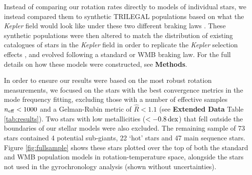 \documentclass[12pt]{article}
\newcommand{\kepler}{\emph{Kepler}\xspace}
\begin{document}
Instead of comparing our rotation rates directly to models of individual stars, we instead compared them to synthetic TRILEGAL populations based on what the \textit{Kepler} field would look like under these two different braking laws \cite{vansaders+2019, girardi+2012}. These synthetic populations were then altered to match the distribution of existing catalogues of stars in the \kepler field in order to replicate the \kepler selection effects \cite{berger+2020}, and evolved following a standard or WMB braking law. For the full details on how these models were constructed, see \textbf{Methods}.

In order to ensure our results were based on the most robust rotation measurements, we focused on the stars with the best convergence metrics in the mode frequency fitting, excluding those with a number of effective samples $n_{\rm eff} < 1000$ and a Gelman-Rubin metric of $\hat{R}<1.1$ \cite{gelman+rubin1992,salvatier+2016} (see \textbf{Extended Data} Table \ref{tab:results}). Two stars with low metallicities ($< -0.8\, \rm {dex}$) that fell outside the boundaries of our stellar models were also excluded. The remaining sample of 73 stars contained 4 potential sub-giants, 22 `hot' stars and 47 main sequence stars. Figure \ref{fig:fullsample} shows these stars plotted over the top of both the standard and WMB population models in rotation-temperature space, alongside the stars not used in the gyrochronology analysis (shown without uncertainties).
\end{document}
